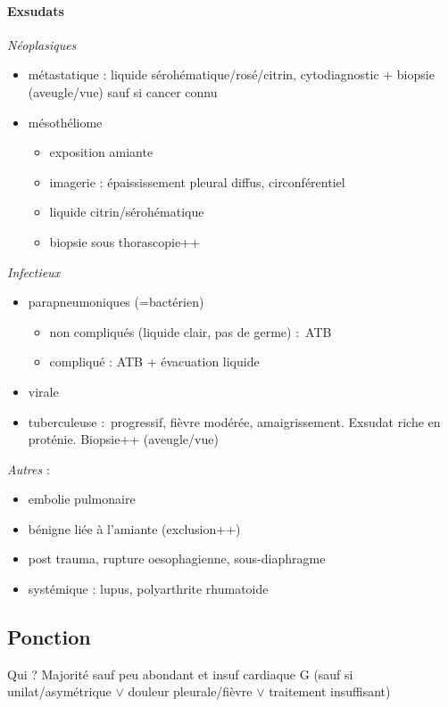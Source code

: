 \documentclass{article}
\begin{document}
\paragraph{Exsudats}
\textit{Néoplasiques} 
\begin{itemize}
  \item métastatique : liquide sérohématique/rosé/citrin, cytodiagnostic +
    biopsie (aveugle/vue) sauf si cancer connu
  \item mésothéliome 
    \begin{itemize}
      \item exposition amiante
      \item imagerie : épaississement pleural diffus, circonférentiel
      \item liquide citrin/sérohématique
      \item biopsie sous thorascopie++
    \end{itemize}
\end{itemize}

\textit{Infectieux} 
\begin{itemize}
  \item parapneumoniques (=bactérien) 
    \begin{itemize}
      \item non compliqués (liquide clair, pas de germe) : ATB
      \item compliqué : ATB + évacuation liquide
    \end{itemize}
  \item virale
  \item tuberculeuse : progressif, fièvre modérée, amaigrissement. Exsudat riche
    en proténie. Biopsie++ (aveugle/vue)
\end{itemize}

\textit{Autres}  :
\begin{itemize}
  \item embolie pulmonaire
  \item bénigne liée à l'amiante (exclusion++)
  \item post trauma, rupture oesophagienne, sous-diaphragme
  \item systémique : lupus, polyarthrite rhumatoide
\end{itemize}

\subsection{Ponction}
Qui ? Majorité sauf peu abondant et insuf cardiaque G (sauf si
unilat/asymétrique $\vee$ douleur pleurale/fièvre $\vee$ traitement insuffisant)
\end{document}
